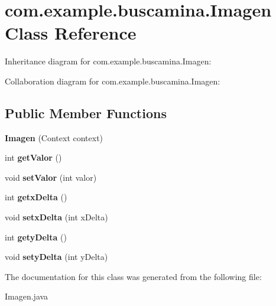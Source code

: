 \section{com.\-example.\-buscamina.\-Imagen Class Reference}
\label{classcom_1_1example_1_1buscamina_1_1_imagen}


Inheritance diagram for com.\-example.\-buscamina.\-Imagen\-:


Collaboration diagram for com.\-example.\-buscamina.\-Imagen\-:
\subsection*{Public Member Functions}
\begin{DoxyCompactItemize}
\item 
{\bfseries Imagen} (Context context)\label{classcom_1_1example_1_1buscamina_1_1_imagen_a3aaa84f566cfadb188f6ac69ca859a48}

\item 
int {\bfseries get\-Valor} ()\label{classcom_1_1example_1_1buscamina_1_1_imagen_a4b447493f5179d2fb850a56dc5a3794d}

\item 
void {\bfseries set\-Valor} (int valor)\label{classcom_1_1example_1_1buscamina_1_1_imagen_a543bf0334b0d51d23b90ee0fb4661102}

\item 
int {\bfseries getx\-Delta} ()\label{classcom_1_1example_1_1buscamina_1_1_imagen_a3875837d3fca79bda13496c20d85ec88}

\item 
void {\bfseries setx\-Delta} (int x\-Delta)\label{classcom_1_1example_1_1buscamina_1_1_imagen_a194e03fcd6d147d2af5962b0de00a201}

\item 
int {\bfseries gety\-Delta} ()\label{classcom_1_1example_1_1buscamina_1_1_imagen_ab7016bb48f2a1b1fcad1b3bcfa896027}

\item 
void {\bfseries sety\-Delta} (int y\-Delta)\label{classcom_1_1example_1_1buscamina_1_1_imagen_a325a08e80557f8d34ce40c433aecb527}

\end{DoxyCompactItemize}


The documentation for this class was generated from the following file\-:\begin{DoxyCompactItemize}
\item 
Imagen.\-java\end{DoxyCompactItemize}

